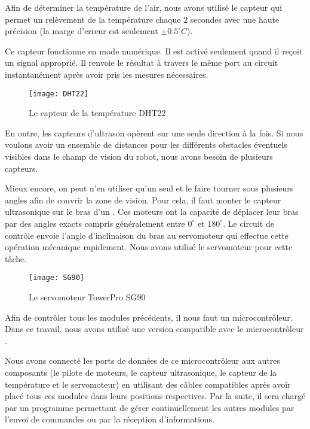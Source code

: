 Afin de déterminer la température de l'air, nous avons utilisé le capteur
 qui permet un relèvement de la température chaque $2$
secondes avec une haute précision (la marge d'erreur est seulement $\pm 0.5 ^\circ C$).

Ce capteur fonctionne en mode numérique. Il est activé seulement quand il reçoit
un signal approprié. Il renvoie le résultat à travers le même port au circuit
instantanément après avoir pris les mesures nécessaires.

\begin{figure}[h]
\begin{center}
\texttt{[image: DHT22]}
\caption{Le capteur de la température DHT22}{}
\end{center}
\end{figure}

En outre, les capteurs d'ultrason opèrent sur une seule direction à la fois. Si
nous voulons avoir un ensemble de distances pour les différents obstacles éventuels
visibles dans le champ de vision du robot, nous avons besoin de plusieurs capteurs.

Mieux encore, on peut n'en utiliser qu'un seul et le faire tourner sous plusieurs
angles afin de couvrir la zone de vision.
Pour cela, il faut monter le capteur ultrasonique sur le bras d'un .
Ces moteurs ont la capacité de déplacer leur bras par des angles exacts compris
généralement entre $0^\circ$ et $180^\circ$. Le circuit de contrôle envoie l'angle
d'inclinaison du bras au servomoteur qui effectue cette opération mécanique rapidement.
Nous avons utilisé le servomoteur  pour cette tâche.

\begin{figure}[h]
\begin{center}
\texttt{[image: SG90]}
\caption{Le servomoteur TowerPro SG90}{}
\end{center}
\end{figure}

Afin de contrôler tous les modules précédents, il nous faut un microcontrôleur.
Dans ce travail, nous avons utilisé une version compatible avec le
microcontrôleur .

Nous avons connecté les ports de données de ce microcontrôleur aux autres
composants (le pilote de moteurs, le capteur ultrasonique, le capteur de la
température et le servomoteur) en utilisant des câbles compatibles après avoir
placé tous ces modules dans leurs positions respectives. Par la suite, il sera
chargé par un programme permettant de gérer continuellement les autres modules
par l'envoi de commandes ou par la réception d'informations.

